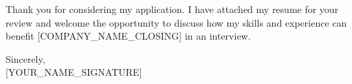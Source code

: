 \documentclass[letterpaper,11pt]{article}
\begin{document}
\begin{raggedright}
\vspace{1\baselineskip}
\end{raggedright}

\begin{raggedright}
\vspace{1\baselineskip}
\end{raggedright}

\begin{raggedright}
Thank you for considering my application. I have attached my resume for your review and welcome the opportunity to discuss how my skills and experience can benefit [COMPANY_NAME_CLOSING] in an interview.
\vspace{2\baselineskip} %
\end{raggedright}

\begin{raggedright}
Sincerely, \\
\vspace{3\baselineskip} %
[YOUR_NAME_SIGNATURE] %
\end{raggedright}
\end{document}
